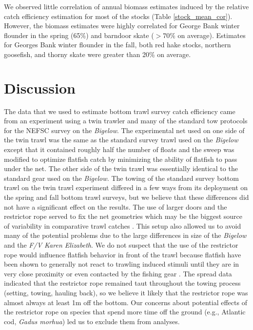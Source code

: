 \documentclass[
  12pt,
]{article}
\begin{document}
We observed little correlation of annual biomass estimates induced by
the relative catch efficiency estimation for most of the stocks (Table
\ref{stock_mean_cor}). However, the biomass estimates were highly
correlated for George Bank winter flounder in the spring (65\%) and
barndoor skate (\(>70\%\) on average). Estimates for Georges Bank winter
flounder in the fall, both red hake stocks, northern goosefish, and
thorny skate were greater than 20\% on average.

\hypertarget{discussion}{%
\section{Discussion}\label{discussion}}

The data that we used to estimate bottom trawl survey catch efficiency
came from an experiment using a twin trawler and many of the standard
tow protocols for the NEFSC survey on the \emph{Bigelow}. The
experimental net used on one side of the twin trawl was the same as the
standard survey trawl used on the \emph{Bigelow} except that it
contained roughly half the number of floats and the sweep was modified
to optimize flatfish catch by minimizing the ability of flatfish to pass
under the net. The other side of the twin trawl was essentially
identical to the standard gear used on the \emph{Bigelow.} The towing of
the standard survey bottom trawl on the twin trawl experiment differed
in a few ways from its deployment on the spring and fall bottom trawl
surveys, but we believe that these differences did not have a
significant effect on the results. The use of larger doors and the
restrictor rope served to fix the net geometries which may be the
biggest source of variability in comparative trawl catches
\citep{jonesetal21}. This setup also allowed us to avoid many of the
potential problems due to the large differences in size of the
\emph{Bigelow} and the \emph{F/V Karen Elizabeth}. We do not suspect
that the use of the restrictor rope would influence flatfish behavior in
front of the trawl because flatfish have been shown to generally not
react to trawling induced stimuli until they are in very close proximity
or even contacted by the fishing gear \citep{ryeretal10}. The spread
data indicated that the restrictor rope remained taut throughout the
towing process (setting, towing, hauling back), so we believe it likely
that the restrictor rope was almost always at least 1m off the bottom.
Our concerns about potential effects of the restrictor rope on species
that spend more time off the ground (e.g., Atlantic cod, \emph{Gadus
morhua}) led us to exclude them from analyses.
\end{document}
